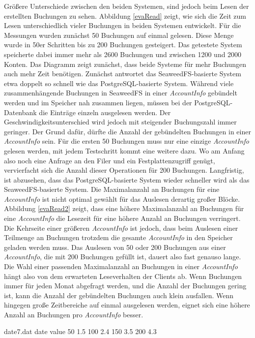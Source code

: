 \documentclass[12pt,oneside,a4paper,parskip]{scrbook}
\begin{document}
Größere Unterschiede zwischen den beiden Systemen, sind jedoch beim Lesen der erstellten Buchungen zu sehen. Abbildung \ref{evaRead} zeigt, wie sich die Zeit zum Lesen unterschiedlich vieler Buchungen in beiden Systemen entwickelt. Für die Messungen wurden zunächst 50 Buchungen auf einmal gelesen. Diese Menge wurde in 50er Schritten bis zu 200 Buchungen gesteigert. Das getestete System speicherte dabei immer mehr als 2600 Buchungen und zwischen 1200 und 2000 Konten. Das Diagramm zeigt zunächst, dass beide Systeme für mehr Buchungen auch mehr Zeit benötigen. Zunächst antwortet das SeaweedFS-basierte System etwa doppelt so schnell wie das PostgreSQL-basierte System. Während viele zusammenhängende Buchungen in SeaweedFS in einer \textit{AccountInfo} gebündelt werden und im Speicher nah zusammen liegen, müssen bei der PostgreSQL-Datenbank die Einträge einzeln ausgelesen werden. Der Geschwindigkeitsunterschied wird jedoch mit steigender Buchungszahl immer geringer. Der Grund dafür, dürfte die Anzahl der gebündelten Buchungen in einer \textit{AccountInfo} sein. Für die ersten 50 Buchungen muss nur eine einzige \textit{AccountInfo} gelesen werden, mit jedem Testschritt kommt eine weitere dazu. Wo am Anfang also noch eine Anfrage an den Filer und ein Festplattenzugriff genügt, vervierfacht sich die Anzahl dieser Operationen für 200 Buchungen. Langfristig, ist abzusehen, dass das PostgreSQL-basierte System wieder schneller wird als das SeaweedFS-basierte System. Die Maximalanzahl an Buchungen für eine \textit{AccountInfo} ist nicht optimal gewählt für das Auslesen derartig großer Blöcke. Abbildung \ref{evaRead2} zeigt, dass eine höhere Maximalanzahl an Buchungen für eine \textit{AccountInfo} die Lesezeit für eine höhere Anzahl an Buchungen verringert. 
Die Kehrseite einer größeren \textit{AccountInfo} ist jedoch, dass beim Auslesen einer Teilmenge an Buchungen trotzdem die gesamte \textit{AccountInfo} in den Speicher geladen werden muss. Das Auslesen von 50 oder 200 Buchungen aus einer \textit{AccountInfo}, die mit 200 Buchungen gefüllt ist, dauert also fast genauso lange. Die Wahl einer passenden Maximalanzahl an Buchungen in einer \textit{AccountInfo} hängt also von dem erwarteten Leseverhalten der Clients ab. Wenn Buchungen immer für jeden Monat abgefragt werden, und die Anzahl der Buchungen gering ist, kann die Anzahl der gebündelten Buchungen auch klein ausfallen. Wenn hingegen große Zeitbereiche auf einmal ausgelesen werden, eignet sich eine höhere Anzahl an Buchungen pro \textit{AccountInfo} besser.


\begin{filecontents}{date7.dat}
date  value
50      1.5
100     2.4
150     3.5
200     4.3
\end{filecontents}
\end{document}
